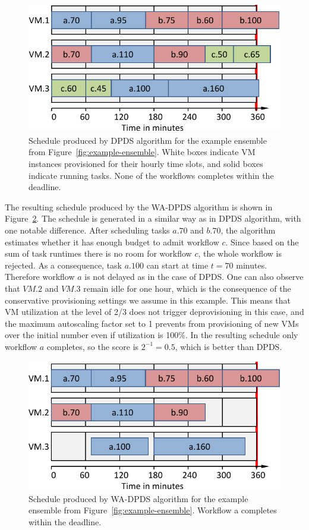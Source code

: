 \documentclass[preprint,5p]{elsarticle}
\begin{document}
\begin{figure}[htb] 
  \centering
  \includegraphics[width=0.80\columnwidth]{figures/algorithms-example-dpds}
  \caption{Schedule produced by DPDS algorithm for the example ensemble from Figure~\ref{fig:example-ensemble}.
  White boxes indicate VM instances provisioned for their hourly time slots, 
  and solid boxes indicate running tasks.
  None of the workflows completes within the deadline.}
  \label{fig:algorithms-example-dpds}
\end{figure}


The resulting schedule produced by the WA-DPDS algorithm is shown in Figure~\ref{fig:algorithms-example-wadpds}.
The schedule is generated in a similar way as in DPDS algorithm, with one notable difference. 
After scheduling tasks $a.70$ and $b.70$, the algorithm estimates whether it has enough budget to 
admit workflow $c$. Since based on the sum of task runtimes there is no room for workflow $c$,
the whole workflow is rejected. As a consequence, task $a.100$ can start at time $t=70$ minutes.
Therefore workflow $a$ is not delayed as in the case of DPDS. One can also observe that $VM.2$ and $VM.3$ remain idle for
one hour, which is the consequence of the conservative provisioning settings we assume in this example.  
This means that VM utilization at the level of 2/3 does not trigger deprovisioning in this case, and the maximum autoscaling
factor set to 1 prevents from provisioning of new VMs over the initial number even if utilization is 100\%.
In the resulting schedule only workflow $a$ completes, so the score is $2^{-1} = 0.5$, which is better than DPDS.

\begin{figure}[htb] 
  \centering
  \includegraphics[width=0.80\columnwidth]{figures/algorithms-example-wadpds}
  \caption{Schedule produced by WA-DPDS algorithm for the example ensemble from Figure~\ref{fig:example-ensemble}.
  Workflow a completes within the deadline.}
  \label{fig:algorithms-example-wadpds}
\end{figure}
\end{document}
